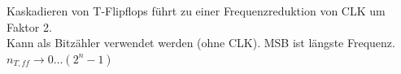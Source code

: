 \begin{center}
\begin{minipage}{0.4\linewidth}
\begin{center}
        \end{center}
    \end{minipage}
\end{center}
Kaskadieren von T-Flipflops führt zu einer Frequenzreduktion von CLK um Faktor 2.\\
Kann als Bitzähler verwendet werden (ohne CLK). MSB ist längste Frequenz. $n_{T,ff} \rightarrow 0\dots (2^n -1)$